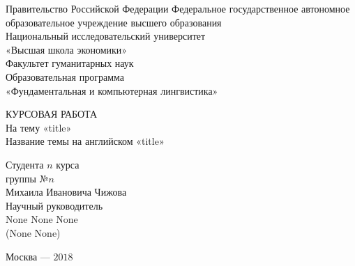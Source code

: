 \thispagestyle{empty}
\begin{center}
\noindent  Правительство Российской Федерации Федеральное государственное автономное образовательное учреждение высшего образования\\

Национальный исследовательский университет\\
«Высшая школа экономики»\\
Факультет гуманитарных наук\bigskip\\

Образовательная программа \\
  «Фундаментальная и компьютерная лингвистика»\\
\vfill


КУРСОВАЯ РАБОТА\\

На тему «title»\\
Название темы на английском  «title»\\
\vfill
\vfill
\begin{flushright}
Студента $n$ курса\\
группы №$n$ \\
Михаила Ивановича Чижова\bigskip\\
                       
Научный руководитель\\
None None None\\
(None None)
\end{flushright}
\vfill
\begin{center}
Москва --- $2018$
\end{center}

\end{center}
\pagebreak
